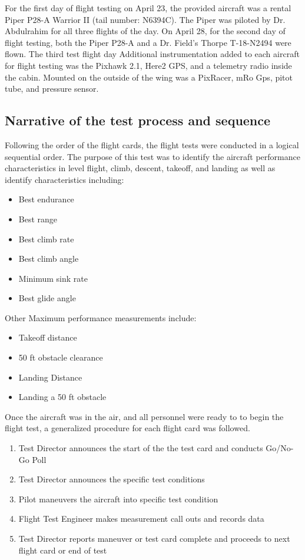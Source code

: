 \documentclass[conf]{new-aiaa}
\begin{document}
For the first day of flight testing on April 23, the provided aircraft was a rental Piper P28-A Warrior II (tail number: N6394C). The Piper was piloted by Dr. Abdulrahim for all three flights of the day. On April 28, for the second day of flight testing, both the Piper P28-A and a Dr. Field's Thorpe T-18-N2494 were flown. The third test flight day  Additional instrumentation added to each aircraft for flight testing was the Pixhawk 2.1, Here2 GPS, and a telemetry radio inside the cabin. Mounted on the outside of the wing was a PixRacer, mRo Gps, pitot tube, and pressure sensor. 

\subsection{Narrative of the test process and sequence}

Following the order of the flight cards, the flight tests were conducted in a logical sequential order. The purpose of this test was to identify the aircraft performance characteristics in level flight, climb, descent, takeoff, and landing as well as identify characteristics including:

\begin{itemize}
\item Best endurance
\item Best range
\item Best climb rate
\item Best climb angle
\item Minimum sink rate
\item Best glide angle
\end{itemize}

\medskip
Other Maximum performance measurements include:

\begin{itemize}
\item Takeoff distance
\item 50 ft obstacle clearance
\item Landing Distance
\item Landing a 50 ft obstacle
\end{itemize}

\medskip 

Once the aircraft was in the air, and all personnel were ready to to begin the flight test, a generalized procedure for each flight card was followed. 

\medskip

\begin{enumerate}

	\item Test Director announces the start of the the test card  and conducts Go/No-Go Poll
	\item Test Director announces the specific test conditions
	\item Pilot maneuvers the aircraft into specific test condition
	\item Flight Test Engineer makes measurement call outs and records data
	\item Test Director reports maneuver or test card complete and proceeds to next flight card or end of test
\end{enumerate}
\end{document}

